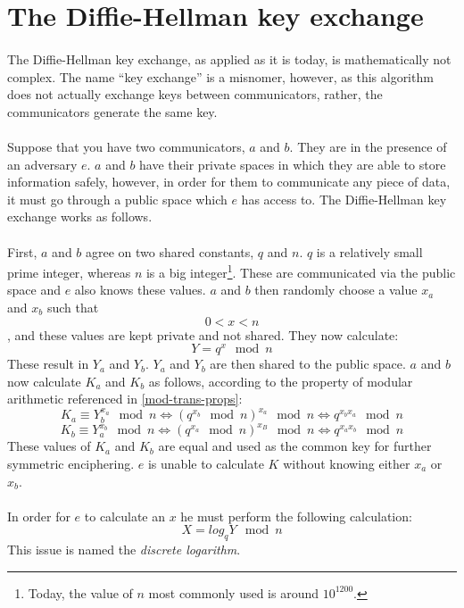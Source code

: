 \documentclass[a4paper, 10pt]{article}
\begin{document}
\section{The Diffie-Hellman key exchange}
\paragraph*{}
The Diffie-Hellman key exchange, as applied as it is today, is mathematically not complex. The name ``key exchange'' is
 a misnomer, however, as this algorithm does not actually exchange keys between communicators, rather, the 
communicators generate the same key.

\paragraph*{}
Suppose that you have two communicators, $a$ and $b$. They are in the presence of an adversary $e$. $a$ and $b$ have 
their private spaces in which they are able to store information safely, however, in order for them to communicate any 
piece of data, it must go through a public space which $e$ has access to. The Diffie-Hellman key exchange works as 
follows.

\paragraph*{}
First, $a$ and $b$ agree on two shared constants, $q$ and $n$. $q$ is a relatively small prime integer, whereas $n$ is 
a big integer\footnote{Today, the value of $n$ most commonly used is around $10^{1200}$.}. These are communicated via 
the public space and $e$ also knows these values. $a$ and $b$ then randomly choose a value $x_a$ and $x_b$ such that 
$$0 < x < n$$, and these values are kept private and not shared. They now calculate:
$$Y = q^x \mod n$$
These result in $Y_a$ and $Y_b$. $Y_a$ and $Y_b$ are then shared to the public space. $a$ and $b$ now calculate $K_a$ 
and $K_b$ as follows, according to the property of modular arithmetic referenced in \ref{mod-trans-props}:
$$K_a \equiv Y_b^{x_a} \mod n \Longleftrightarrow (q^{x_b} \mod n)^{x_a} \mod n \Longleftrightarrow q^{x_b x_a} \mod n$$
$$K_b \equiv Y_a^{x_b} \mod n \Longleftrightarrow (q^{x_a} \mod n)^{x_B} \mod n \Longleftrightarrow q^{x_a x_b} \mod n$$
These values of $K_a$ and $K_b$ are equal and used as the common key for further symmetric enciphering. $e$ is unable 
to calculate $K$ without knowing either $x_a$ or $x_b$.

\paragraph*{}
In order for $e$ to calculate an $x$ he must perform the following calculation:
$$X = log_q Y \mod n$$
This issue is named the \textit{discrete logarithm}.
\end{document}
